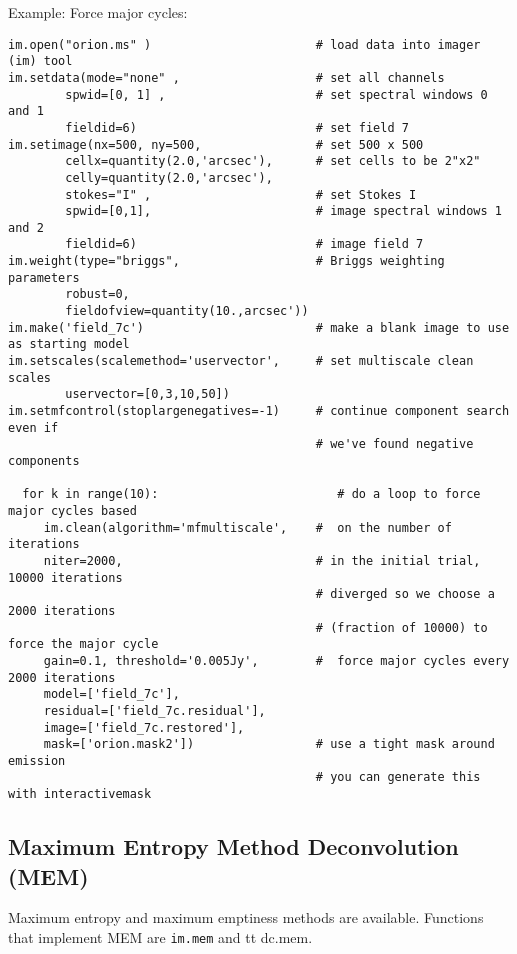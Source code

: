 Example: Force major cycles:

\small
\begin{verbatim}
im.open("orion.ms" )                       # load data into imager (im) tool
im.setdata(mode="none" ,                   # set all channels
        spwid=[0, 1] ,                     # set spectral windows 0 and 1
        fieldid=6)                         # set field 7
im.setimage(nx=500, ny=500,                # set 500 x 500
        cellx=quantity(2.0,'arcsec'),      # set cells to be 2"x2"
        celly=quantity(2.0,'arcsec'),
        stokes="I" ,                       # set Stokes I
        spwid=[0,1],                       # image spectral windows 1 and 2
        fieldid=6)                         # image field 7
im.weight(type="briggs",                   # Briggs weighting parameters
        robust=0,
        fieldofview=quantity(10.,arcsec'))
im.make('field_7c')                        # make a blank image to use as starting model
im.setscales(scalemethod='uservector',     # set multiscale clean scales
        uservector=[0,3,10,50])
im.setmfcontrol(stoplargenegatives=-1)     # continue component search even if
                                           # we've found negative components

  for k in range(10):                         # do a loop to force major cycles based
     im.clean(algorithm='mfmultiscale',    #  on the number of iterations
     niter=2000,                           # in the initial trial, 10000 iterations
                                           # diverged so we choose a 2000 iterations
                                           # (fraction of 10000) to force the major cycle
     gain=0.1, threshold='0.005Jy',        #  force major cycles every 2000 iterations
     model=['field_7c'],
     residual=['field_7c.residual'],
     image=['field_7c.restored'],
     mask=['orion.mask2'])                 # use a tight mask around emission
                                           # you can generate this with interactivemask
\end{verbatim}
\normalsize

\subsection{Maximum Entropy Method Deconvolution (MEM)}
\label{section:imtool.decon.mem}

Maximum entropy and maximum emptiness methods are available. Functions
that implement MEM are {\tt im.mem} and {tt dc.mem}. 

